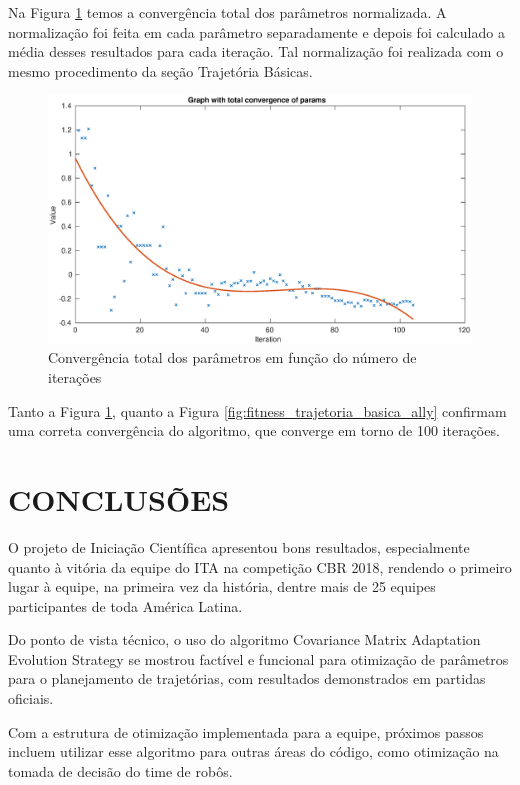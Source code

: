 \documentclass[10pt,fleqn,a4paper]{article}
\begin{document}
Na Figura \ref{fig:convergencia_total_trajetoria_basica_ally} temos a convergência total dos parâmetros normalizada. A normalização foi feita em cada parâmetro separadamente e depois foi calculado a média desses resultados para cada iteração. Tal normalização foi realizada com o mesmo procedimento da seção Trajetória Básicas.

\begin{figure}[H]
	\centering
	\includegraphics[width=1.0\textwidth]{figures/CMA-ES_Total_parameter_convergence_ally.eps}
	\caption{Convergência total dos parâmetros em função do número de iterações}
	\label{fig:convergencia_total_trajetoria_basica_ally}
\end{figure}

Tanto a Figura \ref{fig:convergencia_total_trajetoria_basica_ally}, quanto a Figura \ref{fig:fitness_trajetoria_basica_ally} confirmam uma correta convergência do algoritmo, que converge em torno de 100 iterações.

	\section{CONCLUSÕES}
O projeto de Iniciação Científica apresentou bons resultados, especialmente quanto à vitória da equipe do ITA na competição CBR 2018, rendendo o primeiro lugar à equipe, na primeira vez da história, dentre mais de 25 equipes participantes de toda América Latina.

Do ponto de vista técnico, o uso do algoritmo Covariance Matrix Adaptation Evolution Strategy se mostrou factível e funcional para otimização de parâmetros para o planejamento de trajetórias, com resultados demonstrados em partidas oficiais.

Com a estrutura de otimização implementada para a equipe, próximos passos incluem utilizar esse algoritmo para outras áreas do código, como otimização na tomada de decisão do time de robôs.
\end{document}
